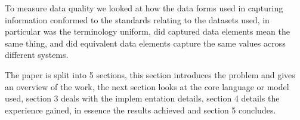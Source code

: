 To measure data quality we looked at how the data forms used in capturing information conformed to the standards relating to the datasets used, in particular was the terminology uniform, did captured data elements mean the same thing, and did equivalent data elements capture the same values across different systems.


The paper is split into 5 sections, this section introduces the problem and gives an overview of the work, the next section looks at the core language or model used, section 3 deals with the implem   entation details, section 4 details the experience gained, in essence the results achieved and section 5 concludes.
